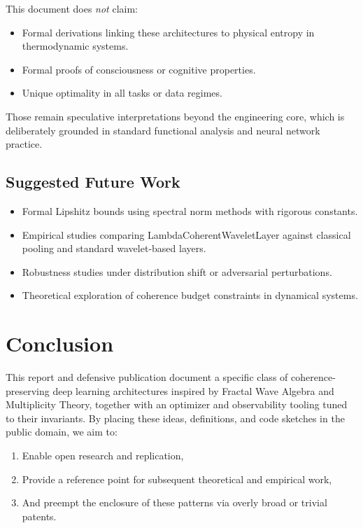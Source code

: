 \documentclass[11pt]{article}
\begin{document}
This document does \emph{not} claim:

\begin{itemize}
  \item Formal derivations linking these architectures to physical entropy in thermodynamic systems.
  \item Formal proofs of consciousness or cognitive properties.
  \item Unique optimality in all tasks or data regimes.
\end{itemize}

Those remain speculative interpretations beyond the engineering core, which is deliberately grounded in standard functional analysis and neural network practice.

\subsection{Suggested Future Work}

\begin{itemize}
  \item Formal Lipshitz bounds using spectral norm methods with rigorous constants.
  \item Empirical studies comparing LambdaCoherentWaveletLayer against classical pooling and standard wavelet-based layers.
  \item Robustness studies under distribution shift or adversarial perturbations.
  \item Theoretical exploration of coherence budget constraints in dynamical systems.
\end{itemize}

\section*{Conclusion}

This report and defensive publication document a specific class of coherence-preserving deep learning architectures inspired by Fractal Wave Algebra and Multiplicity Theory, together with an optimizer and observability tooling tuned to their invariants. By placing these ideas, definitions, and code sketches in the public domain, we aim to:

\begin{enumerate}
  \item Enable open research and replication,
  \item Provide a reference point for subsequent theoretical and empirical work,
  \item And preempt the enclosure of these patterns via overly broad or trivial patents.
\end{enumerate}
\end{document}
